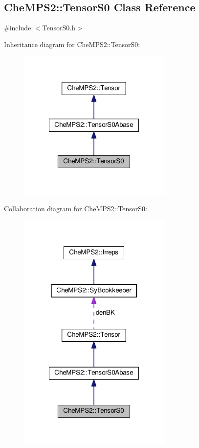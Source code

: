 \hypertarget{classCheMPS2_1_1TensorS0}{\subsection{Che\-M\-P\-S2\-:\-:Tensor\-S0 Class Reference}
\label{classCheMPS2_1_1TensorS0}
}


{\ttfamily \#include $<$Tensor\-S0.\-h$>$}



Inheritance diagram for Che\-M\-P\-S2\-:\-:Tensor\-S0\-:\nopagebreak
\begin{figure}[H]
\begin{center}
\leavevmode
\includegraphics[width=216pt]{classCheMPS2_1_1TensorS0__inherit__graph}
\end{center}
\end{figure}


Collaboration diagram for Che\-M\-P\-S2\-:\-:Tensor\-S0\-:\nopagebreak
\begin{figure}[H]
\begin{center}
\leavevmode
\includegraphics[width=216pt]{classCheMPS2_1_1TensorS0__coll__graph}
\end{center}
\end{figure}
